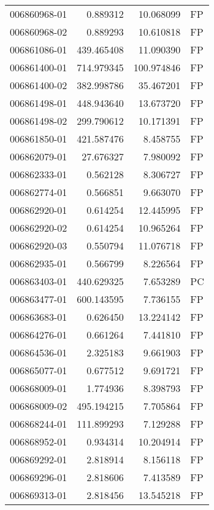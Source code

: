 \begin{tabular}{lrrl}
006860968-01 &    0.889312 &      10.068099 &   FP \\
006860968-02 &    0.889293 &      10.610818 &   FP \\
006861086-01 &  439.465408 &      11.090390 &   FP \\
006861400-01 &  714.979345 &     100.974846 &   FP \\
006861400-02 &  382.998786 &      35.467201 &   FP \\
006861498-01 &  448.943640 &      13.673720 &   FP \\
006861498-02 &  299.790612 &      10.171391 &   FP \\
006861850-01 &  421.587476 &       8.458755 &   FP \\
006862079-01 &   27.676327 &       7.980092 &   FP \\
006862333-01 &    0.562128 &       8.306727 &   FP \\
006862774-01 &    0.566851 &       9.663070 &   FP \\
006862920-01 &    0.614254 &      12.445995 &   FP \\
006862920-02 &    0.614254 &      10.965264 &   FP \\
006862920-03 &    0.550794 &      11.076718 &   FP \\
006862935-01 &    0.566799 &       8.226564 &   FP \\
006863403-01 &  440.629325 &       7.653289 &   PC \\
006863477-01 &  600.143595 &       7.736155 &   FP \\
006863683-01 &    0.626450 &      13.224142 &   FP \\
006864276-01 &    0.661264 &       7.441810 &   FP \\
006864536-01 &    2.325183 &       9.661903 &   FP \\
006865077-01 &    0.677512 &       9.691721 &   FP \\
006868009-01 &    1.774936 &       8.398793 &   FP \\
006868009-02 &  495.194215 &       7.705864 &   FP \\
006868244-01 &  111.899293 &       7.129288 &   FP \\
006868952-01 &    0.934314 &      10.204914 &   FP \\
006869292-01 &    2.818914 &       8.156118 &   FP \\
006869296-01 &    2.818606 &       7.413589 &   FP \\
006869313-01 &    2.818456 &      13.545218 &   FP \\

\end{tabular}
